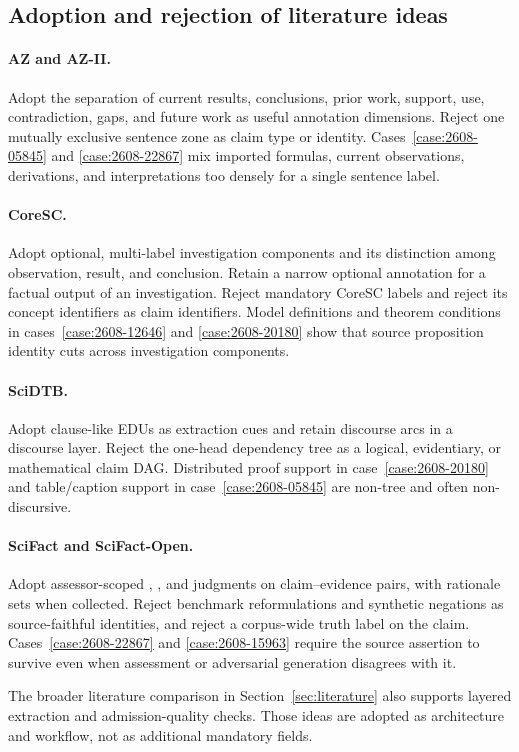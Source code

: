 \subsection{Adoption and rejection of literature ideas}

\paragraph{AZ and AZ-II.}
Adopt the separation of current results, conclusions, prior work, support, use, contradiction, gaps, and future work as useful annotation dimensions. Reject one mutually exclusive sentence zone as claim type or identity. Cases~\ref{case:2608-05845} and \ref{case:2608-22867} mix imported formulas, current observations, derivations, and interpretations too densely for a single sentence label.

\paragraph{CoreSC.}
Adopt optional, multi-label investigation components and its distinction among observation, result, and conclusion. Retain a narrow optional  annotation for a factual output of an investigation. Reject mandatory CoreSC labels and reject its concept identifiers as claim identifiers. Model definitions and theorem conditions in cases~\ref{case:2608-12646} and \ref{case:2608-20180} show that source proposition identity cuts across investigation components.

\paragraph{SciDTB.}
Adopt clause-like EDUs as extraction cues and retain discourse arcs in a discourse layer. Reject the one-head dependency tree as a logical, evidentiary, or mathematical claim DAG. Distributed proof support in case~\ref{case:2608-20180} and table/caption support in case~\ref{case:2608-05845} are non-tree and often non-discursive.

\paragraph{SciFact and SciFact-Open.}
Adopt assessor-scoped , , and  judgments on claim--evidence pairs, with rationale sets when collected. Reject benchmark reformulations and synthetic negations as source-faithful identities, and reject a corpus-wide truth label on the claim. Cases~\ref{case:2608-22867} and \ref{case:2608-15963} require the source assertion to survive even when assessment or adversarial generation disagrees with it.

The broader literature comparison in Section~\ref{sec:literature} also supports layered extraction and admission-quality checks. Those ideas are adopted as architecture and workflow, not as additional mandatory fields.